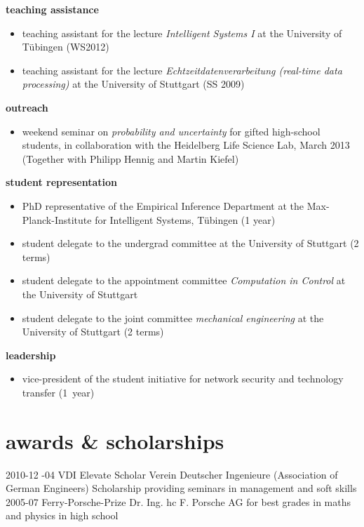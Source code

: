 \documentclass[a4paper]{k-cv} %
\begin{document}
{\Large \bfseries teaching assistance}
\begin{itemize}
 \item teaching assistant for the lecture \emph{Intelligent Systems I} at the
University of T\"ubingen (WS2012)
\item teaching assistant for the lecture \emph{Echtzeitdatenverarbeitung
(real-time data processing)} at the University of Stuttgart (SS 2009)
\end{itemize}

{\Large \bfseries outreach}
\begin{itemize}
 \item weekend seminar on \emph{probability and uncertainty} for gifted
high-school students, in collaboration with the Heidelberg Life Science Lab,
March 2013 (Together with Philipp Hennig and Martin Kiefel)
\end{itemize}

{\Large \bfseries student representation}
\begin{itemize}
 \item PhD representative of the Empirical Inference Department at the
Max-Planck-Institute for Intelligent Systems, T\"ubingen (1 year)
 \item student delegate to the undergrad committee at the University of
Stuttgart (2 terms)
\item student delegate to the appointment committee \emph{Computation in
Control} at the University of Stuttgart
\item student delegate to the joint committee \emph{mechanical engineering} at
the University of Stuttgart (2 terms)
\end{itemize}

{\Large \bfseries leadership}
\begin{itemize}
 \item vice-president of the student initiative for network security and
technology transfer (1~year)
\end{itemize}

%
\section{awards \& scholarships}\normalfont

\begin{entrylist}
\entry
{2010-12 -04}
{VDI Elevate Scholar}
{Verein Deutscher Ingenieure (Association of German Engineers)}
{Scholarship providing seminars in management and soft skills}
\entry
{2005-07}
{Ferry-Porsche-Prize}
{Dr. Ing. hc F. Porsche AG}
{for best grades in maths and physics in high school}
\end{entrylist}
\end{document}
